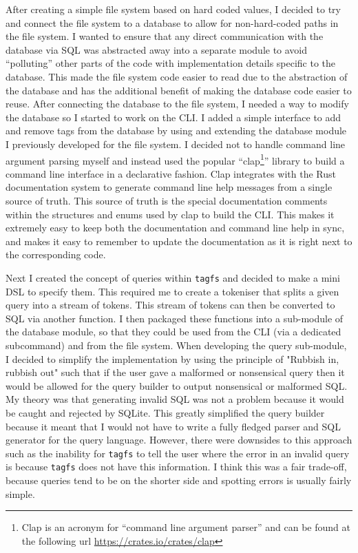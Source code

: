 After creating a simple file system based on hard coded values, I decided to
try and connect the file system to a database to allow for non-hard-coded paths
in the file system. I wanted to ensure that any direct communication with the
database via SQL was abstracted away into a separate module to avoid
``polluting'' other parts of the code with implementation details specific to
the database. This made the file system code easier to read due to the
abstraction of the database and has the additional benefit of making the
database code easier to reuse. After connecting the database to the file
system, I needed a way to modify the database so I started to work on the CLI.
I added a simple interface to add and remove tags from the database by using
and extending the database module I previously developed for the file system. I
decided not to handle command line argument parsing myself and instead used the
popular ``clap\footnote{Clap is an acronym for ``command line argument parser''
and can be found at the following url \url{https://crates.io/crates/clap}}''
library to build a command line interface in a declarative fashion. Clap
integrates with the Rust documentation system to generate command line help
messages from a single source of truth. This source of truth is the special
documentation comments within the structures and enums used by clap to build
the CLI. This makes it extremely easy to keep both the documentation and
command line help in sync, and makes it easy to remember to update the
documentation as it is right next to the corresponding code. 

Next I created the concept of queries within \texttt{tagfs} and decided to make
a mini DSL to specify them. This required me to create a tokeniser that splits
a given query into a stream of tokens. This stream of tokens can then be
converted to SQL via another function. I then packaged these functions into a
sub-module of the database module, so that they could be used from the CLI (via
a dedicated subcommand) and from the file system. When developing the query
sub-module, I decided to simplify the implementation by using the principle of
"Rubbish in, rubbish out" such that if the user gave a malformed or nonsensical
query then it would be allowed for the query builder to output nonsensical or
malformed SQL. My theory was that generating invalid SQL was not a problem
because it would be caught and rejected by SQLite. This greatly simplified the
query builder because it meant that I would not have to write a fully fledged
parser and SQL generator for the query language. However, there were downsides
to this approach such as the inability for \texttt{tagfs} to tell the user
where the error in an invalid query is because \texttt{tagfs} does not have
this information. I think this was a fair trade-off, because queries tend to be
on the shorter side and spotting errors is usually fairly simple.

